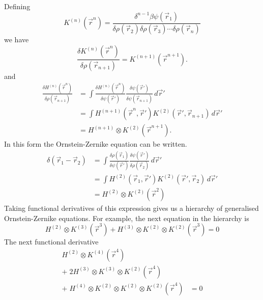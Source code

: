 \documentclass[12pt]{report}
\begin{document}
Defining
\begin{equation*}
  K^{(n)}(\vec{r}^n) =
  \frac{\delta^{n-1} \beta\psi(\vec{r}_1)}{\delta \rho(\vec{r}_2) \delta \rho(\vec{r}_3) \cdots \delta \rho(\vec{r}_n)}
\end{equation*}
we have
\begin{equation*}
  \frac{\delta K^{(n)}(\vec{r}^n)}{\delta \rho(\vec{r}_{n+1})} =
  K^{(n+1)}(\vec{r}^{n+1}).
\end{equation*}
and
\begin{equation*}
  \begin{aligned}
    \frac{\delta H^{(n)}(\vec{r}^n)}{\delta \rho(\vec{r}_{n+1})}
    &=
    \int
    \frac{\delta H^{(n)}(\vec{r}^n)}{\delta \psi(\vec{r}')}
    \frac{\delta \psi(\vec{r}')}{\delta \psi(\vec{r}_{n+1})}
    \, d\vec{r}' \\
    &=
    \int
    H^{(n+1)}(\vec{r}^n, \vec{r}')
    K^{(2)}(\vec{r}', \vec{r}_{n+1})
    \, d\vec{r}' \\
    &=
    H^{(n+1)} \otimes K^{(2)}(\vec{r}^{n+1}).
  \end{aligned}
\end{equation*}
In this form the Ornstein-Zernike equation can be written.
\begin{equation*}
  \begin{aligned}
    \delta(\vec{r}_1 - \vec{r}_2) &=
    \int
    \frac{\delta \rho(\vec{r}_1)}{\delta \psi(\vec{r}')}
    \frac{\delta \psi(\vec{r}')}{\delta \rho(\vec{r}_2)}
    \, d\vec{r}' \\
    &=
    \int
    H^{(2)}(\vec{r}_1, \vec{r}') K^{(2)}(\vec{r}', \vec{r}_2)
    \, d\vec{r}' \\
    &=
    H^{(2)} \otimes K^{(2)} (\vec{r}^2)
  \end{aligned}
\end{equation*}
Taking functional derivatives of this expression gives us a hierarchy of generalised Ornstein-Zernike equations.
For example, the next equation in the hierarchy is
\begin{equation*}
  H^{(2)} \otimes K^{(3)} (\vec{r}^3) +
  H^{(3)} \otimes K^{(2)} \otimes K^{(2)} (\vec{r}^3) = 0
\end{equation*}
The next functional derivative
\begin{equation}
  \begin{aligned}
  H^{(2)} \otimes K^{(4)} (\vec{r}^4) & \\
  + \; 2 H^{(3)} \otimes K^{(3)} \otimes K^{(2)} (\vec{r}^4) & \\
  + \; H^{(4)} \otimes K^{(2)} \otimes K^{(2)} \otimes K^{(2)} (\vec{r}^4)
  &= 0
  \end{aligned}
\end{equation}
\end{document}

